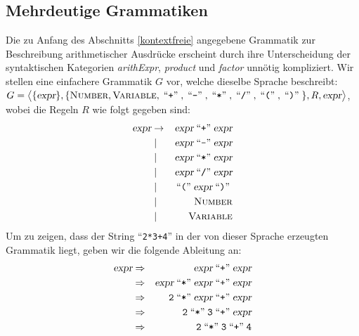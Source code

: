 \subsection{Mehrdeutige Grammatiken}
Die zu Anfang des Abschnitts \ref{kontextfreie} angegebene Grammatik zur Beschreibung arithmetischer
Ausdr\"ucke erscheint durch ihre Unterscheidung der syntaktischen Kategorien \textsl{arithExpr},
\textsl{product} und \textsl{factor} unn\"otig kompliziert.  Wir stellen eine einfachere Grammatik $G$
vor, welche dieselbe Sprache beschreibt:
\\[0.2cm]
\hspace*{1.3cm}
$G = \bigl\langle \{\textsl{expr}\}, \{ \textsc{Number}, \textsc{Variable}, \;\mbox{``\texttt{+}''}\;, \;\mbox{``\texttt{-}''}\;, \;\mbox{``\texttt{*}''}\;, \;\mbox{``\texttt{/}''}\;, \;\mbox{``\texttt{(}''}\;, \;\mbox{``\texttt{)}''}\; \}, R, \textsl{expr} \bigr\rangle$,
\\[0.2cm]
wobei die Regeln $R$ wie folgt gegeben sind:
\begin{eqnarray*}
  \textsl{expr} & \rightarrow & \textsl{expr} \;\mbox{``\texttt{+}''}\; \textsl{expr}  \\
                & \mid        & \textsl{expr} \;\mbox{``\texttt{-}''}\; \textsl{expr}  \\
                & \mid        & \textsl{expr} \;\mbox{``\texttt{*}''}\; \textsl{expr}  \\
                & \mid        & \textsl{expr} \;\mbox{``\texttt{/}''}\; \textsl{expr}  \\
                & \mid        & \;\mbox{``\texttt{(}''}\; \textsl{expr} \;\mbox{``\texttt{)}''}\;     \\
                & \mid        & \textsc{Number}                         \\
                & \mid        & \textsc{Variable}                         
\end{eqnarray*}
Um zu zeigen, dass der String ``\texttt{2*3+4}'' in der von dieser Sprache erzeugten
Grammatik liegt, geben wir die folgende Ableitung an:
\begin{eqnarray*}
\textsl{expr} & \Rightarrow & \textsl{expr} \;\mbox{``\texttt{+}''}\; \textsl{expr}                           \\
              & \Rightarrow & \textsl{expr} \;\mbox{``\texttt{*}''}\; \textsl{expr} \;\mbox{``\texttt{+}''}\; \textsl{expr}  \\
              & \Rightarrow & \texttt{2} \;\mbox{``\texttt{*}''}\; \textsl{expr} \;\mbox{``\texttt{+}''}\; \textsl{expr}     \\
              & \Rightarrow & \texttt{2} \;\mbox{``\texttt{*}''}\; \texttt{3} \;\mbox{``\texttt{+}''}\; \textsl{expr}        \\
              & \Rightarrow & \texttt{2} \;\mbox{``\texttt{*}''}\; \texttt{3} \;\mbox{``\texttt{+}''}\; \texttt{4}           
\end{eqnarray*}
